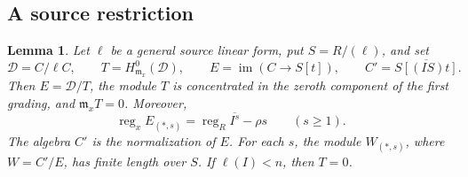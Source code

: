\documentclass[12pt]{amsart}
\numberwithin{equation}{section}
\newtheorem{lemma}[theorem]{Lemma}
\theoremstyle{definition}
\theoremstyle{remark}
\numberwithin{equation}{section}
\DeclareMathOperator{\reg}{reg}
\begin{document}
\subsection{A source restriction}
\begin{lemma}\label{lem:full-defect-section}
	Let $\ell$ be a general source linear form, put $S=R/(\ell)$, and set
	\[
	\mathcal D=C/\ell C,\qquad T=H^0_{\mathfrak m_x}(\mathcal D),\qquad
	E=\operatorname{im}(C\longrightarrow S[t]),\qquad
	C'=\overline{S[(IS)t]}.
	\]
	Then $E=\mathcal D/T$, the module $T$ is concentrated in the zeroth component of the first grading, and $\mathfrak m_xT=0$. Moreover,
	\[
	\reg_xE_{(*,s)}=\reg_R\overline{I^s}-\rho s
	\qquad(s\ge1).
	\]
	The algebra $C'$ is the normalization of $E$. For each $s$, the module $W_{(*,s)}$, where $W=C'/E$, has finite length over $S$.
	If $\ell(I)<n$, then $T=0$.
\end{lemma}
\end{document}
